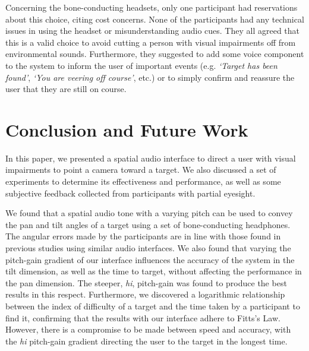 \documentclass[sigconf, review=true, screen=true, anonymous=true]{acmart}
\begin{document}
Concerning the bone-conducting headsets, only one participant had reservations about this choice, citing cost concerns. None of the participants had any technical issues in using the headset or misunderstanding audio cues. They all agreed that this is a valid choice to avoid cutting a person with visual impairments off from environmental sounds. Furthermore, they suggested to add some voice component to the system to inform the user of important events (e.g. \emph{`Target has been found'}, \emph{`You are veering off course'}, etc.) or to simply confirm and reassure the user that they are still on course. 


\section{Conclusion and Future Work}
\label{sec:conclusion}

In this paper, we presented a spatial audio interface to direct a user with visual impairments to point a camera toward a target. We also discussed a set of experiments to determine its effectiveness and performance, as well as some subjective feedback collected from participants with partial eyesight. 

We found that a spatial audio tone with a varying pitch can be used to convey the pan and tilt angles of a target using a set of bone-conducting headphones. The angular errors made by the participants are in line with those found in previous studies using similar audio interfaces. We also found that varying the pitch-gain gradient of our interface influences the accuracy of the system in the tilt dimension, as well as the time to target, without affecting the performance in the pan dimension. The steeper, \emph{hi}, pitch-gain was found to produce the best results in this respect. Furthermore, we discovered a logarithmic relationship between the index of difficulty of a target and the time taken by a participant to find it, confirming that the results with our interface adhere to Fitts's Law. However, there is a compromise to be made between speed and accuracy, with the \emph{hi} pitch-gain gradient directing the user to the target in the longest time. 
\end{document}
